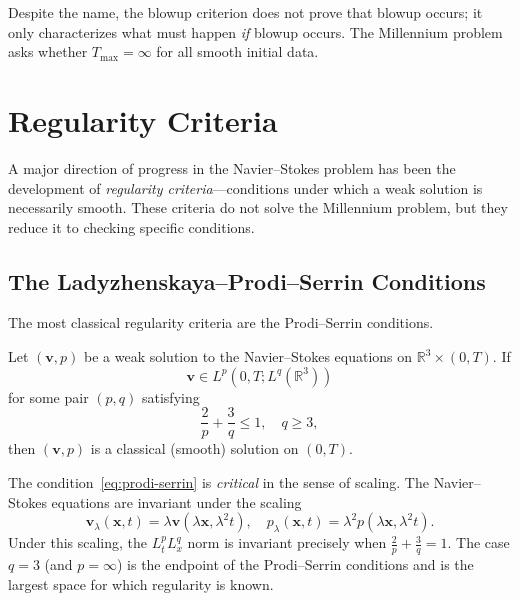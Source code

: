 \begin{remark}
Despite the name, the blowup criterion does not prove that blowup occurs; it only characterizes what must happen \emph{if} blowup occurs. The Millennium problem asks whether $T_{\max} = \infty$ for all smooth initial data.
\end{remark}

\section{Regularity Criteria}
\label{sec:NS-regularity}

A major direction of progress in the Navier--Stokes problem has been the development of \emph{regularity criteria}---conditions under which a weak solution is necessarily smooth. These criteria do not solve the Millennium problem, but they reduce it to checking specific conditions.

\subsection{The Ladyzhenskaya--Prodi--Serrin Conditions}

The most classical regularity criteria are the Prodi--Serrin conditions.

\begin{theorem}
\label{thm:prodi-serrin}
Let $(\mathbf{v}, p)$ be a weak solution to the Navier--Stokes equations on $\mathbb{R}^3 \times (0, T)$. If
\[
\mathbf{v} \in L^p(0, T; L^q(\mathbb{R}^3))
\]
for some pair $(p, q)$ satisfying
\begin{equation}
\label{eq:prodi-serrin}
\frac{2}{p} + \frac{3}{q} \le 1, \quad q \ge 3,
\end{equation}
then $(\mathbf{v}, p)$ is a classical (smooth) solution on $(0, T)$.
\end{theorem}

\begin{remark}
The condition~\eqref{eq:prodi-serrin} is \emph{critical} in the sense of scaling. The Navier--Stokes equations are invariant under the scaling
\[
\mathbf{v}_\lambda(\mathbf{x}, t) = \lambda \mathbf{v}(\lambda \mathbf{x}, \lambda^2 t), \quad p_\lambda(\mathbf{x}, t) = \lambda^2 p(\lambda \mathbf{x}, \lambda^2 t).
\]
Under this scaling, the $L^p_t L^q_x$ norm is invariant precisely when $\frac{2}{p} + \frac{3}{q} = 1$. The case $q = 3$ (and $p = \infty$) is the endpoint of the Prodi--Serrin conditions and is the largest space for which regularity is known.
\end{remark}

